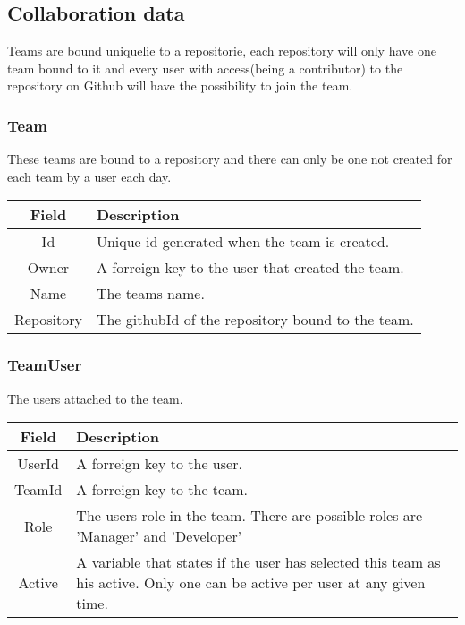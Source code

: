 \subsection{Collaboration data}
Teams are bound uniquelie to a repositorie, each repository will only have one team bound to it and every user with access(being a contributor) to the repository on Github will have the possibility to join the team.  \\%
\subsubsection*{Team}
These teams are bound to a repository and there can only be one not created for each team by a user each day. \\

\vspace{0.5cm}
\begin{tabularx}{\linewidth}{| c | X |}
    \hline
    \rowcolor[gray]{0.8}
    \textbf{Field} & \textbf{Description} \\
    \hline
    Id & Unique id generated when the team is created.\\ \hline
   	Owner & A forreign key to the user that created the team.\\ \hline
   	Name & The teams name.\\ \hline
    Repository & The githubId of the repository bound to the team.\\ 
    \hline
\end{tabularx}
\vspace{0.5cm}

\subsubsection*{TeamUser}
The users attached to the team. \\

\vspace{0.5cm}
\begin{tabularx}{\linewidth}{| c | X |}
    \hline
    \rowcolor[gray]{0.8}
    \textbf{Field} & \textbf{Description} \\
    \hline
    UserId & A forreign key to the user.\\ \hline
   	TeamId & A forreign key to the team.\\ \hline
   	Role & The users role in the team. There are possible roles are 'Manager' and 'Developer'\\ \hline
    Active & A variable that states if the user has selected this team as his active. Only one can be active per user at any given time.\\ 
    \hline
\end{tabularx}
\vspace{0.5cm}

